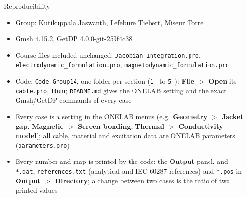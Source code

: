 \documentclass[aspectratio=169,10pt]{beamer}
\begin{document}
\begin{frame}{Reproducibility}
\small
\begin{itemize}
\item Group: Kutikuppala Jaswanth, Lefebure Tiebert, Miseur Torre
\item Gmsh 4.15.2, GetDP 4.0.0-git-259f4c38
\item Course files included unchanged: \texttt{Jacobian\_Integration.pro}, \texttt{electrodynamic\_formulation.pro},
\texttt{magnetodynamic\_formulation.pro}
\item Code: \texttt{Code\_Group14}, one folder per section (\texttt{1-} to \texttt{5-}): \textbf{File $>$ Open} its \texttt{cable.pro}, \textbf{Run};
\texttt{README.md} gives the ONELAB setting and the exact Gmsh/GetDP commands of every case
\item Every case is a setting in the ONELAB menus (e.g.\ \textbf{Geometry $>$ Jacket gap}, \textbf{Magnetic $>$ Screen bonding},
\textbf{Thermal $>$ Conductivity model}); all cable, material and excitation data are ONELAB parameters (\texttt{parameters.pro})
\item Every number and map is printed by the code: the \textbf{Output} panel, and \texttt{*.dat}, \texttt{references.txt} (analytical and IEC 60287
references) and \texttt{*.pos} in \textbf{Output $>$ Directory}; a change between two cases is the ratio of two printed values
\end{itemize}
\end{frame}
\end{document}
